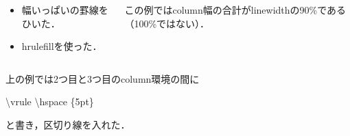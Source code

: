 \documentclass[unicode, 9pt, aspectratio=169]{beamer}
\begin{document}
\begin{frame}
\begin{columns}
\begin{column}{.3\linewidth}
        \begin{itemize}
            \item 幅いっぱいの罫線をひいた．
            \item hrulefillを使った．
        \end{itemize} 
    \end{column}
    \vrule \hspace{5pt}
    \begin{column}{.4\linewidth}
        \hrulefill

        この例ではcolumn幅の合計がlinewidthの90\%である（100\%ではない）．
    \end{column}
\end{columns}
\vspace{10pt}

\begin{minipage}{.7\linewidth}
    \begin{roundbox}{\linewidth}
    \centering
    上の例では2つ目と3つ目のcolumn環境の間に

    \backslash vrule \backslash hspace \{5pt\}

    と書き，区切り線を入れた．
    \end{roundbox}
\end{minipage}
\end{frame}
\end{document}
